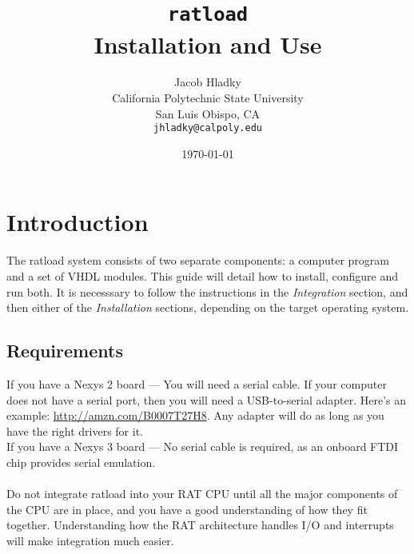 \documentclass[notitlepage]{article}
\makeatletter
\newcommand*{\toccontents}{\@starttoc{toc}}
\makeatother
\begin{document}
\title{\huge{\texttt{ratload}\\ Installation and Use}}
\author{
  Jacob Hladky\\
  California Polytechnic State University\\
  San Luis Obispo, CA\\
  \texttt{jhladky@calpoly.edu}
}
\date{\today}
\maketitle

\toccontents


\section{Introduction}
The ratload system consists of two separate components: a computer program and a set of VHDL modules. This guide will detail how to install, configure and run both. It is necesssary to follow the instructions in the \emph{Integration} section, and then either of the \emph{Installation} sections, depending on the target operating system.

\subsection{Requirements}
If you have a Nexys 2 board --- You will need a serial cable. If your computer does not have a serial port, then you will need a USB-to-serial adapter. Here's an example: \url{http://amzn.com/B0007T27H8}. Any adapter will do as long as you have the right drivers for it.\\
If you have a Nexys 3 board --- No serial cable is required, as an onboard FTDI chip provides serial emulation.\\\\
Do not integrate ratload into your RAT CPU until all the major components of the CPU are in place, and you have a good understanding of how they fit together. Understanding how the RAT architecture handles I/O and interrupts will make integration much easier.
\end{document}
